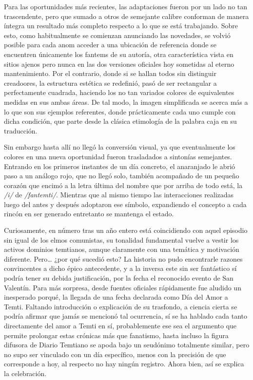 \documentclass[
]{book}
\begin{document}
Para las oportunidades más recientes, las adaptaciones fueron por un lado no tan trascendente, pero que sumado a otros de semejante calibre conforman de manera íntegra un resultado más completo respecto a lo que se está trabajando. Sobre esto, como habitualmente se comienzan anunciando las novedades, se volvió posible para cada anom acceder a una ubicación de referencia donde se encuentren únicamente los fantems de su autoría, otra característica vista en sitios ajenos pero nunca en las dos versiones oficiales hoy sometidas al eterno mantenimiento. Por el contrario, donde si se hallan todos sin distinguir creadoores, la estructura estética se redefinió, pasó de ser rectangular a perfectamente cuadrada, haciendo los no tan variados colores de equivalentes medidas en sus ambas áreas. De tal modo, la imagen simplificada se acerca más a lo que son sus ejemplos referentes, donde prácticamente cada uno cumple con dicha condición, que parte desde la clásica etimología de la palabra caja en su traducción.

Sin embargo hasta allí no llegó la conversión visual, ya que eventualmente los colores en una nueva oportunidad fueron trasladados a sintonías semejantes. Entrando en los primeros instantes de un día concreto, el anaranjado le abrió paso a un análogo rojo, que no llegó solo, también acompañado de un pequeño corazón que encimó a la letra última del nombre que por arriba de todo está, la \emph{/i/} de \emph{/fantemti/}. Mientras que al mismo tiempo las interacciones realizadas luego del antes y después adoptaron ese símbolo, expandiendo el concepto a cada rincón en ser generado entretanto se mantenga el estado.

Curiosamente, en número tras un año entero está coincidiendo con aquel episodio sin igual de los elmos comunistas, su tonalidad fundamental vuelve a vestir los activos dominios temtianos, aunque claramente con una temática y motivación diferente. Pero\ldots{} ¿por qué sucedió esto? La historia no pudo encontrarle razones convincentes a dicho épico antecedente, y a la inversa este sin ser fantástico sí podría tener su debida justificación, por la fecha el reconocido evento de San Valentín. Para más sorpresa, desde fuentes oficiales rápidamente fue aludido un inesperado porqué, la llegada de una fecha declarada como Día del Amor a Temti. Faltando introducción o explicación de su trasfondo, a ciencia cierta se podría afirmar que jamás se mencionó tal ocurrencia, sí se ha hablado cada tanto directamente del amor a Temti en sí, probablemente ese sea el argumento que permite prolongar estas crónicas más que fanatismo, hasta incluso la figura difusora de Diario Temtiano se apoda bajo un seudónimo totalmente similar, pero no supo ser vinculado con un día específico, menos con la precisión de que corresponde a hoy, al respecto no hay ningún registro. Ahora bien, así se explica la celebración.
\end{document}
